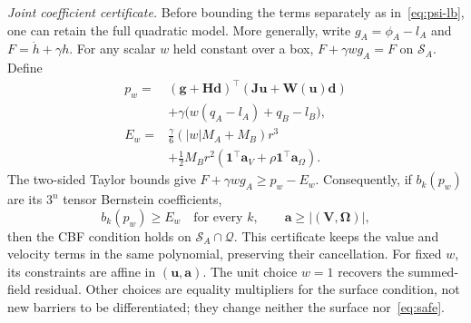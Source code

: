 \documentclass[journal]{IEEEtran}
\theoremstyle{definition}
\begin{document}
\emph{Joint coefficient certificate.} Before bounding the terms separately as
in~\eqref{eq:psi-lb}, one can retain the full quadratic model. More generally, write
$g_A=\phi_A-l_A$ and $F=\dot h+\gamma h$. For any scalar $w$ held constant over a box,
$F+\gamma w g_A=F$ on $\mathcal S_A$. Define
\begin{equation}\label{eq:joint-model}
\begin{aligned}
p_w={}&(\mathbf g+\mathbf H\mathbf d)^\top
              (\mathbf J\mathbf u+\mathbf W(\mathbf u)\mathbf d)\\
 &+\gamma\big(w(q_A-l_A)+q_B-l_B\big),\\
E_w={}&\tfrac\gamma6(|w|M_A+M_B)r^3\\
 &+\tfrac12M_Br^2(\mathbf1^\top\mathbf a_V+
                       \rho\mathbf1^\top\mathbf a_\Omega).
\end{aligned}
\end{equation}
The two-sided Taylor bounds give $F+\gamma w g_A\ge p_w-E_w$.
Consequently, if $b_k(p_w)$ are its $3^n$ tensor Bernstein coefficients,
\begin{equation}\label{eq:joint-coef}
b_k(p_w)\ge E_w\quad\text{for every }k,\qquad
\mathbf a\ge|(\mathbf V,\boldsymbol\Omega)|,
\end{equation}
then the CBF condition holds on $\mathcal S_A\cap\mathcal Q$. This certificate keeps
the value and velocity terms in the same polynomial, preserving their cancellation.
For fixed $w$, its constraints are affine in $(\mathbf u,\mathbf a)$.
The unit choice $w=1$ recovers the summed-field residual. Other choices are equality
multipliers for the surface condition, not new barriers to be differentiated;
they change neither the surface nor~\eqref{eq:safe}.
\end{document}
